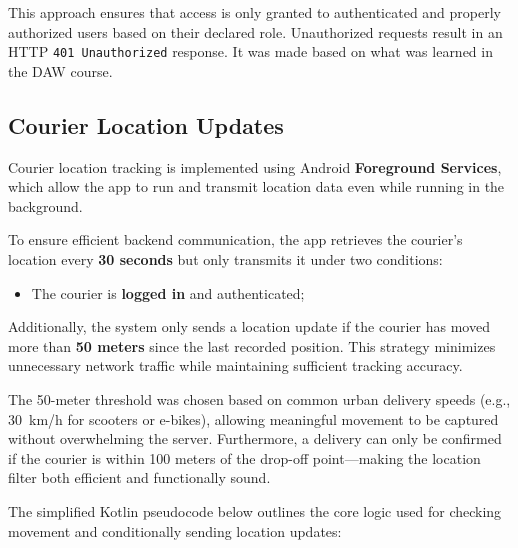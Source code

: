 This approach ensures that access is only granted to authenticated and properly authorized users based on their declared role. Unauthorized requests result in an HTTP \texttt{401 Unauthorized} response. It was made based on what was learned in the DAW course.

\subsection{Courier Location Updates}

Courier location tracking is implemented using Android \textbf{Foreground Services}, which allow the app to run and transmit location data even while running in the background.

To ensure efficient backend communication, the app retrieves the courier’s location every \textbf{30 seconds} but only transmits it under two conditions:
\begin{itemize}
    \item The courier is \textbf{logged in} and authenticated;
\end{itemize}

Additionally, the system only sends a location update if the courier has moved more than \textbf{50 meters} since the last recorded position. This strategy minimizes unnecessary network traffic while maintaining sufficient tracking accuracy.

The 50-meter threshold was chosen based on common urban delivery speeds (e.g., 30~km/h for scooters or e-bikes), allowing meaningful movement to be captured without overwhelming the server. Furthermore, a delivery can only be confirmed if the courier is within 100 meters of the drop-off point—making the location filter both efficient and functionally sound.

\newpage

The simplified Kotlin pseudocode below outlines the core logic used for checking movement and conditionally sending location updates:

